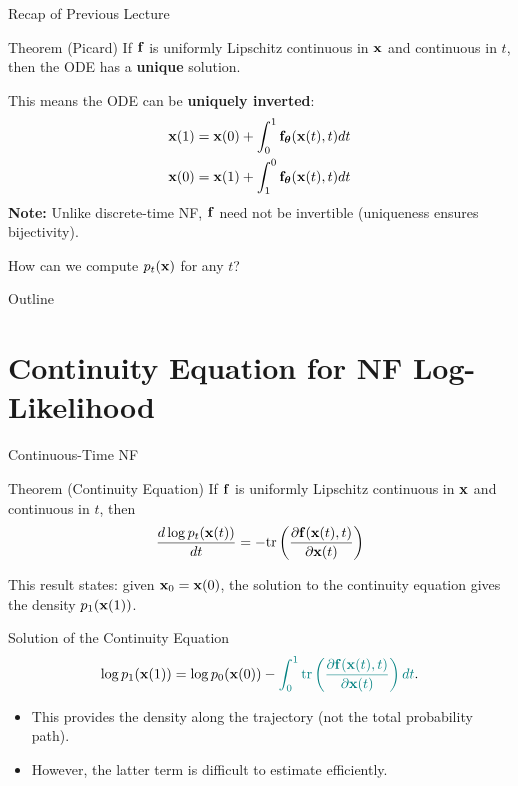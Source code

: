 \documentclass{beamer}
\begin{document}
\begin{frame}{Recap of Previous Lecture}
	\begin{block}{Theorem (Picard)}
		If $\mathbf{f}$ is uniformly Lipschitz continuous in $\mathbf{x}$ and continuous in $t$, then the ODE has a \textbf{unique} solution.
	\end{block}
	This means the ODE can be \textbf{uniquely inverted}:
	\begin{align*}
		\mathbf{x}(1) &= \mathbf{x}(0) + \int_{0}^{1} \mathbf{f}_{\boldsymbol{\theta}}(\mathbf{x}(t), t) dt \\
		\mathbf{x}(0) &= \mathbf{x}(1) + \int_{1}^{0} \mathbf{f}_{\boldsymbol{\theta}}(\mathbf{x}(t), t) dt
	\end{align*}
	\textbf{Note:} Unlike discrete-time NF, $\mathbf{f}$ need not be invertible (uniqueness ensures bijectivity).
	
	How can we compute $p_t(\mathbf{x})$ for any $t$?
\end{frame}
\begin{frame}{Outline}
	\tableofcontents
\end{frame}
\section{Continuity Equation for NF Log-Likelihood}
\begin{frame}{Continuous-Time NF}
	\begin{block}{Theorem (Continuity Equation)}
		If $\mathbf{f}$ is uniformly Lipschitz continuous in $\mathbf{x}$ and continuous in $t$, then
		\[
			\frac{d \log p_t(\mathbf{x}(t))}{d t} = - \text{tr} \left( \frac{\partial \mathbf{f}(\mathbf{x}(t), t)}{\partial \mathbf{x}(t)} \right)
		\]
		\vspace{-0.3cm}
	\end{block}
	This result states: given $\mathbf{x}_0 = \mathbf{x}(0)$, the solution to the continuity equation gives the density $p_1(\mathbf{x}(1))$.
	\begin{block}{Solution of the Continuity Equation}
		\vspace{-0.3cm}
		\[
			\log p_1(\mathbf{x}(1)) = \log p_0(\mathbf{x}(0)) - {\color{teal}\int_{0}^{1} \text{tr}  \left( \frac{\partial \mathbf{f}(\mathbf{x}(t), t)}{\partial \mathbf{x}(t)} \right) dt}.
		\]
	\end{block}
	\begin{itemize}
		\item This provides the density along the trajectory (not the total probability path).
		\item However, {\color{teal}the latter term} is difficult to estimate efficiently.
	\end{itemize}
\end{frame}
\end{document}
